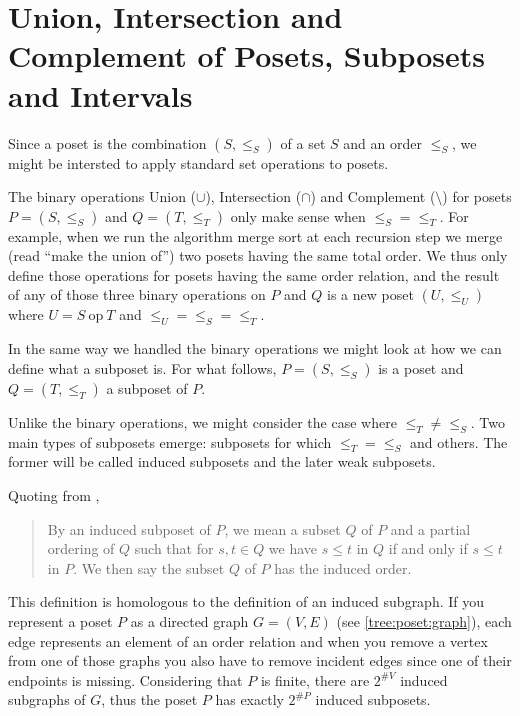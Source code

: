 \section{Union, Intersection and Complement of Posets, Subposets and Intervals}
\label{tree:poset:sub}


Since a poset is the combination $(S, \le_S)$ of a set $S$ and an order $\le_S$, we might be intersted to apply standard set operations to posets.

The binary operations Union ($\cup$), Intersection ($\cap$) and Complement ($\setminus$) for posets $P = (S, \le_S)$ and $Q = (T, \le_T)$ only make sense when $\le_S = \le_T$. For example, when we run the algorithm merge sort at each recursion step we merge (read ``make the union of'') two posets having the same total order. We thus only define those operations for posets having the same order relation, and the result of any of those three binary operations on $P$ and $Q$ is a new poset $(U, \le_U)$ where $U = S~\text{op}~T$ and $\le_U = \le_S = \le_T$.


In the same way we handled the binary operations we might look at how we can define what a subposet is. For what follows, $P = (S, \le_S)$ is a poset and $Q = (T, \le_T)$ a subposet of $P$.

Unlike the binary operations, we might consider the case where $\le_T \neq \le_S$. Two main types of subposets emerge: subposets for which $\le_T = \le_S$ and others. The former will be called induced subposets and the later weak subposets.

Quoting from \cite{Stanley:2011:ECV:2124415},

\begin{quotation}

By an induced subposet of $P$, we mean a subset $Q$ of $P$ and a partial ordering of $Q$ such that for $s, t \in Q$ we have $s \leq t$ in $Q$ if and only if $s \leq t$ in $P$. We then say the subset $Q$ of $P$ has the induced order.

\end{quotation}

This definition is homologous to the definition of an induced subgraph. If you represent a poset $P$ as a directed graph $G = (V, E)$ (see \ref{tree:poset:graph}), each edge represents an element of an order relation and when you remove a vertex from one of those graphs you also have to remove incident edges since one of their endpoints is missing. Considering that $P$ is finite, there are $2^{\#V}$ induced subgraphs of $G$, thus the poset $P$ has exactly $2^{\#P}$ induced subposets.


